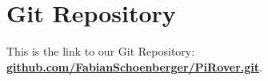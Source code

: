 \section{Git Repository}

This is the link to our Git Repository:\\
\href{https://github.com/FabianSchoenberger/PiRover.git}{\textbf{github.com/FabianSchoenberger/PiRover.git}}.
